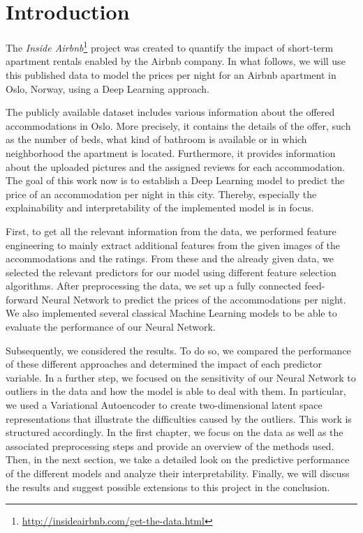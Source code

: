 \section{Introduction}

The \emph{Inside Airbnb}\footnote{\url{http://insideairbnb.com/get-the-data.html}} project \citep{cox2022} was created to quantify the impact of short-term apartment rentals enabled by the Airbnb company.
In what follows, we will use this published data to model the prices per night for an Airbnb apartment in Oslo, Norway, using a Deep Learning approach.

The publicly available dataset includes various information about the offered accommodations in Oslo.
More precisely, it contains the details of the offer, such as the number of beds, what kind of bathroom is available or in which neighborhood the apartment is located.
Furthermore, it provides information about the uploaded pictures and the assigned reviews for each accommodation.
The goal of this work now is to establish a Deep Learning model to predict the price of an accommodation per night in this city.
Thereby, especially the explainability and interpretability of the implemented model is in focus.

First, to get all the relevant information from the data, we performed feature engineering to mainly extract additional features from the given images of the accommodations and the ratings.
From these and the already given data, we selected the relevant predictors for our model using different feature selection algorithms.
After preprocessing the data, we set up a fully connected feed-forward Neural Network to predict the prices of the accommodations per night.
We also implemented several classical Machine Learning models to be able to evaluate the performance of our Neural Network.

Subsequently, we considered the results.
To do so, we compared the performance of these different approaches and determined the impact of each predictor variable.
In a further step, we focused on the sensitivity of our Neural Network to outliers in the data and how the model is able to deal with them.
In particular, we used a Variational Autoencoder to create two-dimensional latent space representations that illustrate the difficulties caused by the outliers.
This work is structured accordingly.
In the first chapter, we focus on the data as well as the associated preprocessing steps and provide an overview of the methods used.
Then, in the next section, we take a detailed look on the predictive performance of the different models and analyze their interpretability.
Finally, we will discuss the results and suggest possible extensions to this project in the conclusion.

